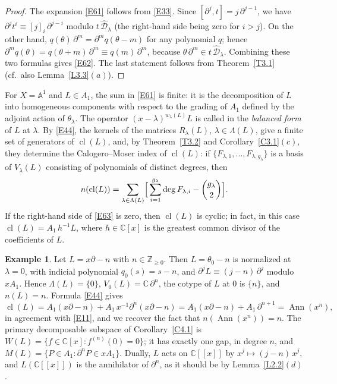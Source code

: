 \documentclass[11pt,reqno]{amsart}
\theoremstyle{plain}
\theoremstyle{definition}
\newtheorem{example}{Example}[section]
\theoremstyle{remark}
\numberwithin{equation}{section}
\newcommand{\cD}{\mathcal{D}}
\newcommand{\C}{\mathbb{C}}
\newcommand{\Z}{\mathbb{Z}}
\newcommand{\A}{\mathbb{A}}
\newcommand{\del}{\partial}
\newcommand{\hD}{\widehat{\cD}}
\newcommand{\ff}[2]{[#1]_{#2}}          %
\DeclareMathOperator{\Ann}{Ann}
\DeclareMathOperator{\cl}{cl}
\begin{document}
\begin{proof}
The expansion \eqref{E61} follows from \eqref{E33}. Since $[\del^j, t] = j\, \del^{j-1}$, we have
$\del^j t^i \equiv \ff{j}{i}\, \del^{j-i}$ modulo $t\, \hD_\lambda$ (the right-hand side being
zero for $i > j$). On the other hand, $q(\theta)\, \del^m = \del^m q(\theta - m)$ for any
polynomial $q$; hence $\del^m q(\theta) = q(\theta + m)\, \del^m \equiv q(m)\, \del^m$, because
$\theta\, \del^m \in t\, \hD_\lambda$. Combining these two formulas gives \eqref{E62}. The last
statement follows from Theorem~\ref{T3.1} (cf.\ also Lemma~\ref{L3.3}$(a)$).
\end{proof}

For $X = \A^1$ and $L \in A_1$, the sum in \eqref{E61} is finite: it is the decomposition of
$L$ into homogeneous components with respect to the grading of $A_1$ defined by the adjoint
action of $\theta_\lambda$. The operator $(x - \lambda)^{w_\lambda(L)} L$ is called in
\cite{Tsai} the \emph{balanced form} of $L$ at $\lambda$. By \eqref{E44}, the kernels of the
matrices $R_\lambda(L)$, $\lambda \in \Lambda(L)$, give a finite set of generators of $\cl(L)$,
and, by Theorem~\ref{T3.2} and Corollary~\ref{C3.1}$(c)$, they determine the Calogero--Moser index
of $\cl(L)$: if $\{F_{\lambda, 1}, \ldots, F_{\lambda, g_\lambda}\}$ is a basis of $V_\lambda(L)$
consisting of polynomials of distinct degrees, then
\begin{equation}
\label{E63}
  n(\cl(L)) = \sum_{\lambda \in \Lambda(L)} \Bigl[\, \sum_{i=1}^{g_\lambda} \deg F_{\lambda, i} -
  \binom{g_\lambda}{2} \Bigr] .
\end{equation}
If the right-hand side of \eqref{E63} is zero, then $\cl(L)$ is cyclic; in fact, in this case
$\cl(L) = A_1\, h^{-1} L$, where $h \in \C[x]$ is the greatest common divisor of the coefficients
of $L$.

\begin{example}
\label{Ex6.1}
Let $L = x \del - n$ with $n \in \Z_{\ge 0}$. Then $L = \theta_0 - n$ is normalized at $\lambda =
0$, with indicial polynomial $q_0(s) = s - n$, and $\del^j L \equiv (j - n)\, \del^j$ modulo
$x A_1$. Hence $\Lambda(L) = \{0\}$, $V_0(L) = \C\, \del^n$, the cotype of $L$ at $0$ is $\{n\}$,
and $n(L) = n$. Formula \eqref{E44} gives
\[
  \cl(L) = A_1 (x \del - n) + A_1\, x^{-1} \del^n (x \del - n) = A_1 (x\del - n) + A_1\,
  \del^{n+1} = \Ann(x^n) ,
\]
in agreement with \eqref{E11}, and we recover the fact that $n(\Ann(x^n)) = n$. The primary
decomposable subspace of Corollary~\ref{C4.1} is $W(L) = \{ f \in \C[x] : f^{(n)}(0) = 0 \}$; it
has exactly one gap, in degree $n$, and $M(L) = \{P \in A_1 : \del^n P \in x A_1\}$. Dually, $L$
acts on $\C[[x]]$ by $x^j \mapsto (j - n)\, x^j$, and $L(\C[[x]])$ is the annihilator of $\del^n$,
as it should be by Lemma~\ref{L2.2}$(d)$.
\end{example}
\end{document}
